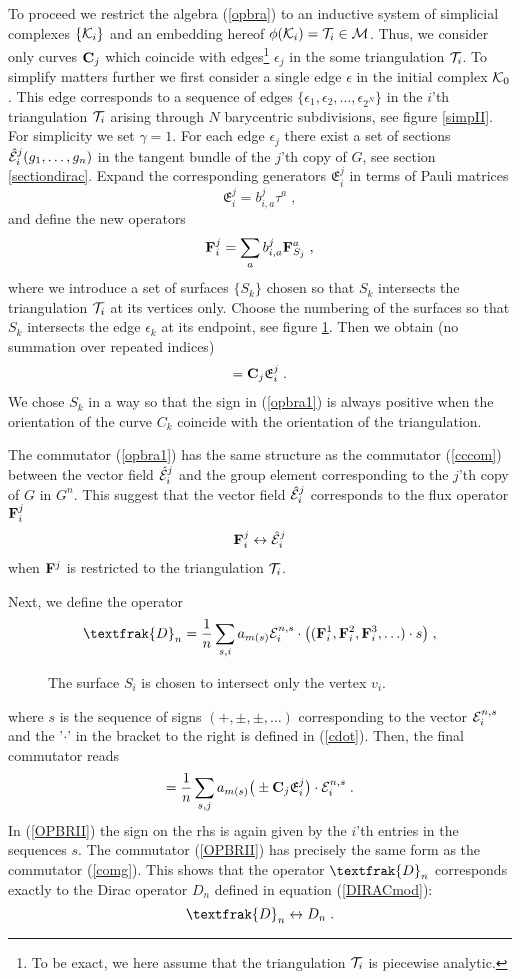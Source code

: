 \documentclass[12pt]{article}
\newcommand{\ba}{\begin{eqnarray}}
\newcommand{\ea}{\end{eqnarray}}
\def\e{\epsilon}
\def\t{\tau}
\def\ce{{\cal E}}
\def\ck{{\cal K}}
\def\cm{{\cal M}}
\def\ct{{\cal T}}
\begin{document}
To proceed we restrict the algebra (\ref{opbra}) to an inductive system of simplicial complexes $\{\ck_i\}$ and an embedding hereof $\phi(\ck_i)=\ct_i\in\cm$. Thus, we consider only curves ${\bf C}_j$ which coincide with edges\footnote{To be exact, we here assume that the triangulation $\ct_i$ is piecewise analytic.} $\e_j$ in the some triangulation $\ct_i$. To simplify matters further we first consider a single edge $\e$ in the initial complex $\ck_0$. This edge corresponds to a sequence of edges $\{\e_1,\e_2,\ldots,\e_{2^N} \}$ in the $i$'th triangulation $\ct_i$ arising through $N$ barycentric subdivisions, see figure \ref{simpII}. For simplicity we set $\gamma=1$. For each edge $\e_j$ there exist a set of sections $\hat{\ce}_i^j(g_1,\ldots,g_n)$ in the tangent bundle of the $j$'th copy of $G$, see section \ref{sectiondirac}. Expand the corresponding generators $\mathfrak{E}^j_i$ in terms of Pauli matrices
\[
\mathfrak{E}_i^j= b^{j}_{i,a}\t^a\;,
\]
and define the new operators
\[
{\bf F}^j_i=\sum_{a} b^j_{i,a}{\bf F}^a_{S_j}\;,
\]
where we introduce a set of surfaces $\{S_k\}$ chosen so that $S_k$ intersects the triangulation $\ct_i$ at its vertices only. Choose the numbering of the surfaces so that $S_k$ intersects the edge $\e_k$ at its endpoint, see figure \ref{IntersectionS}. Then we obtain (no summation over repeated indices)
\ba
[{\bf F}^j_i,{\bf C}_j]= {\bf C}_j\mathfrak{E}^j_i\;.
\label{opbra1}
\ea
We chose $S_k$ in a way so that the sign in (\ref{opbra1}) is always positive when the orientation of the curve $C_k$ coincide with the orientation of the triangulation. 

The commutator (\ref{opbra1}) has the same structure as the commutator (\ref{cccom}) between the vector field $\hat{\ce}^j_i$ and the group element corresponding to the $j$'th copy of $G$ in $G^n$. This suggest that the vector field $\hat{\ce}^j_i$ corresponds to the flux operator ${\bf F}^j_i$
\ba 
{\bf F}^j_i\leftrightarrow \hat{\ce}^j_i
\label{coRRe}
\ea
when ${\bf F}^j$ is restricted to the triangulation $\ct_i$.


Next, we define the operator
\ba
\textfrak{D}_n=\frac{1}{n}\sum_{s,i} a_{m(s)}\ce^{n,s}_i\cdot\big(({\bf F}^1_i,{\bf F}^2_i,{\bf F}^3_i,\ldots)\cdot s\big)\;,
\label{Dfrak}
\ea
\begin{figure} [t]
\begin{center}
 
\caption{The surface $S_i$ is chosen to intersect only the vertex $v_i$.}
\label{IntersectionS}
\end{center}
\end{figure}
where $s$ is the sequence of signs $(+,\pm,\pm,\ldots)$ corresponding to the vector $\ce^{n,s}_i$ and the '$\cdot$' in the bracket to the right is defined in (\ref{cdot}). Then, the final commutator reads
\ba 
[{\bf\textfrak{D}}_n,{\bf C}_j]=\frac{1}{n}\sum_{s,j} a_{m(s)} \big(\pm {\bf C}_j \mathfrak{E}^j_i\big)\cdot \ce^{n,s}_i\;.
\label{OPBRII}
\ea
In (\ref{OPBRII}) the sign on the rhs is again given by the $i$'th entries in the sequences $s$. The commutator (\ref{OPBRII}) has precisely the same form as the commutator (\ref{comg}).  This shows that the operator ${\textfrak{D}}_n$ corresponds exactly to the Dirac operator $D_n$ defined in equation (\ref{DIRACmod}):
\[
{\textfrak{D}}_n\leftrightarrow D_n\;.
\]
\end{document}
